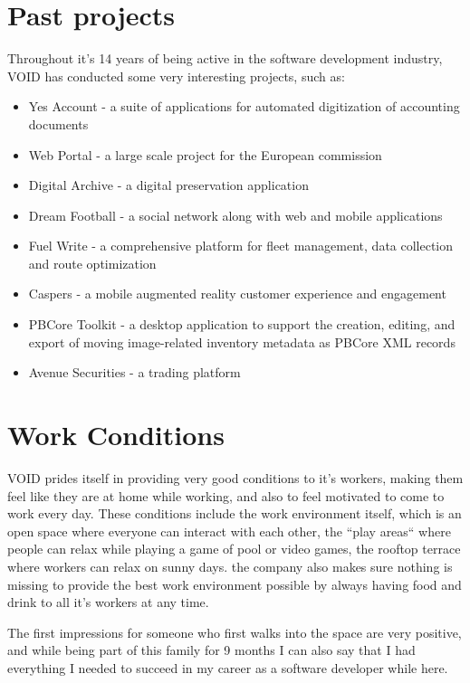 \section{Past projects}

Throughout it's 14 years of being active in the software development industry, VOID has conducted some very interesting projects, such as:
\begin{itemize}
 \item Yes Account - a suite of applications for automated digitization of accounting documents
 \item Web Portal - a large scale project for the European commission
 \item Digital Archive - a digital preservation application
 \item Dream Football - a social network along with web and mobile applications 
 \item Fuel Write - a comprehensive platform for fleet management, data collection and route optimization
 \item Caspers - a mobile augmented reality customer experience and engagement
 \item PBCore Toolkit - a desktop application to support the creation, editing, and export of moving image-related inventory metadata as PBCore XML records
 \item Avenue Securities - a trading platform
\end{itemize}

\section{Work Conditions}

VOID prides itself in providing very good conditions to it's workers, making them feel like they are at home while working,
and also to feel motivated to come to work every day. These conditions include the work environment itself, which is an open space where 
everyone can interact with each other, the ``play areas`` where people can relax while playing a game of pool or video games, the rooftop terrace where workers can relax on sunny days.
the company also makes sure nothing is missing to provide the best work environment possible by always having food and drink to all it's workers at any time.

The first impressions for someone who first walks into the space are very positive, and while being part of this family for 9 months I can also say that I had everything 
I needed to succeed in my career as a software developer while here.
